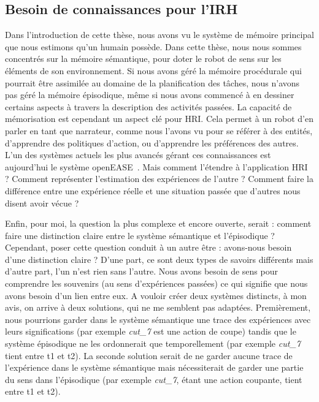 \subsection*{Besoin de connaissances pour l'IRH}

Dans l'introduction de cette thèse, nous avons vu le système de mémoire principal que nous estimons qu'un humain possède. Dans cette thèse, nous nous sommes concentrés sur la mémoire sémantique, pour doter le robot de sens sur les éléments de son environnement. Si nous avons géré la mémoire procédurale qui pourrait être assimilée au domaine de la planification des tâches, nous n'avons pas géré la mémoire épisodique, même si nous avons commencé à en dessiner certains aspects à travers la description des activités passées. La capacité de mémorisation est cependant un aspect clé pour HRI. Cela permet à un robot d'en parler en tant que narrateur, comme nous l'avons vu pour se référer à des entités, d'apprendre des politiques d'action, ou d'apprendre les préférences des autres. L'un des systèmes actuels les plus avancés gérant ces connaissances est aujourd'hui le système openEASE~\cite{beetz_2015_open}. Mais comment l'étendre à l'application HRI ? Comment représenter l'estimation des expériences de l'autre ? Comment faire la différence entre une expérience réelle et une situation passée que d'autres nous disent avoir vécue ?

Enfin, pour moi, la question la plus complexe et encore ouverte, serait : comment faire une distinction claire entre le système sémantique et l'épisodique ? Cependant, poser cette question conduit à un autre être : avons-nous besoin d'une distinction claire ? D'une part, ce sont deux types de savoirs différents mais d'autre part, l'un n'est rien sans l'autre. Nous avons besoin de sens pour comprendre les souvenirs (au sens d'expériences passées) ce qui signifie que nous avons besoin d'un lien entre eux. A vouloir créer deux systèmes distincts, à mon avis, on arrive à deux solutions, qui ne me semblent pas adaptées. Premièrement, nous pourrions garder dans le système sémantique une trace des expériences avec leurs significations (par exemple \textit{cut\_7} est une action de coupe) tandis que le système épisodique ne les ordonnerait que temporellement (par exemple \textit{cut\_7} tient entre t1 et t2). La seconde solution serait de ne garder aucune trace de l'expérience dans le système sémantique mais nécessiterait de garder une partie du sens dans l'épisodique (par exemple \textit{cut\_7}, étant une action coupante, tient entre t1 et t2).


